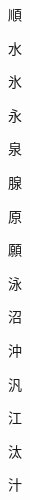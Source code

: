 \begin{spacing}{2.5}
{\Huge \begin{CJK}{UTF8}{min} 順\end{CJK}}\hspace{0.1cm}
{\Huge \begin{CJK}{UTF8}{min} 水\end{CJK}}\hspace{0.1cm}
{\Huge \begin{CJK}{UTF8}{min} 氷\end{CJK}}\hspace{0.1cm}
{\Huge \begin{CJK}{UTF8}{min} 永\end{CJK}}\hspace{0.1cm}
{\Huge \begin{CJK}{UTF8}{min} 泉\end{CJK}}\hspace{0.1cm}
{\Huge \begin{CJK}{UTF8}{min} 腺\end{CJK}}\hspace{0.1cm}
{\Huge \begin{CJK}{UTF8}{min} 原\end{CJK}}\hspace{0.1cm}
{\Huge \begin{CJK}{UTF8}{min} 願\end{CJK}}\hspace{0.1cm}
{\Huge \begin{CJK}{UTF8}{min} 泳\end{CJK}}\hspace{0.1cm}
{\Huge \begin{CJK}{UTF8}{min} 沼\end{CJK}}\hspace{0.1cm}
{\Huge \begin{CJK}{UTF8}{min} 沖\end{CJK}}\hspace{0.1cm}
{\Huge \begin{CJK}{UTF8}{min} 汎\end{CJK}}\hspace{0.1cm}
{\Huge \begin{CJK}{UTF8}{min} 江\end{CJK}}\hspace{0.1cm}
{\Huge \begin{CJK}{UTF8}{min} 汰\end{CJK}}\hspace{0.1cm}
{\Huge \begin{CJK}{UTF8}{min} 汁\end{CJK}}\hspace{0.1cm}

\end{spacing}

